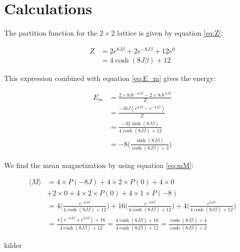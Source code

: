 \documentclass{article}
\begin{document}
\clearpage

\appendix \section{Calculations} %

The partition function for the $2\times2$ lattice is given by equation \ref{eq:Z}:

\begin{equation}
\begin{split}
Z&=2e^{8J\beta}+2e^{-8J\beta}+12e^0\\
&=4\cosh{(8J\beta)}+12
\end{split}
\label{eq:calc_Z}
\end{equation}

This expression combined with equation \ref{eq:E_m} gives the energy:

\begin{equation}
\begin{split}
E_m &= \frac{2\times8Je^{-8J\beta}-2\times8Je^{8J\beta}}{Z}\\
&=\frac{-16J(e^{8J\beta}-e^{-8J\beta})}{Z}\\
&=\frac{-32\sinh{(8J\beta)}}{4\cosh{(8J\beta)}+12}\\
&=-8\bigg(\frac{\sinh{(8J\beta)}}{\cosh{(8J\beta)}+3}\bigg)
\label{eq:calc_E}
\end{split}
\end{equation}


We find the mean magnetization by using equation \ref{eq:mM}:

\begin{equation} \label{eq:calc_M}
\begin{split}
\langle M \rangle& = 4 \times P(-8J) + 4 \times 2 \times P(0) + 4 \times 0 \\
& + 2\times0+4 \times 2 \times P(0) + 4 \times 1 \times P(-8)\\
&=4\bigg(\frac{e^{-8J\beta }}{4\cosh{(8J\beta)}+12}\bigg)+16\bigg(\frac{e^{-0J\beta}}{4\cosh{(8J\beta)}+12}\bigg)+4\bigg(\frac{e^{8J\beta }}{4\cosh{(8J\beta)}+12}\bigg) \\
&=\frac{4(e^{-8J\beta}+e^{8J\beta})+16} {4\cosh{(8J\beta)}+12} =\frac{4\cosh{(8J\beta)}+16} {4\cosh{(8J\beta)}+12}=\frac{\cosh{(8J\beta)}+4} {\cosh{(8J\beta)}+3}
\end{split}
\end{equation}

\begin{thebibliography}{9}
	kilder
\end{thebibliography}
\end{document}
